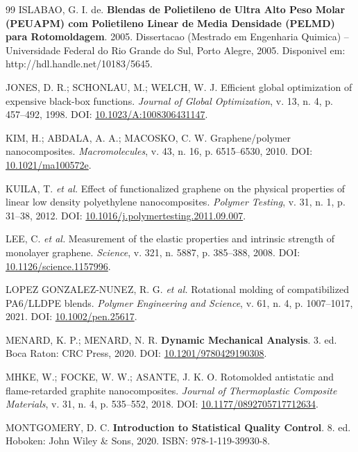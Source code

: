 \documentclass[11pt,a4paper,oneside]{article}
\begin{document}
\begin{thebibliography}{99}
 ISLABAO, G. I. de. \textbf{Blendas de Polietileno de Ultra Alto Peso Molar (PEUAPM) com Polietileno Linear de Media Densidade (PELMD) para Rotomoldagem}. 2005. Dissertacao (Mestrado em Engenharia Quimica) -- Universidade Federal do Rio Grande do Sul, Porto Alegre, 2005. Disponivel em: http://hdl.handle.net/10183/5645.

 JONES, D. R.; SCHONLAU, M.; WELCH, W. J. Efficient global optimization of expensive black-box functions. \textit{Journal of Global Optimization}, v. 13, n. 4, p. 457--492, 1998. DOI: \href{https://doi.org/10.1023/A:1008306431147}{10.1023/A:1008306431147}.

 KIM, H.; ABDALA, A. A.; MACOSKO, C. W. Graphene/polymer nanocomposites. \textit{Macromolecules}, v. 43, n. 16, p. 6515--6530, 2010. DOI: \href{https://doi.org/10.1021/ma100572e}{10.1021/ma100572e}.

 KUILA, T. \textit{et al.} Effect of functionalized graphene on the physical properties of linear low density polyethylene nanocomposites. \textit{Polymer Testing}, v. 31, n. 1, p. 31--38, 2012. DOI: \href{https://doi.org/10.1016/j.polymertesting.2011.09.007}{10.1016/j.polymertesting.2011.09.007}.

 LEE, C. \textit{et al.} Measurement of the elastic properties and intrinsic strength of monolayer graphene. \textit{Science}, v. 321, n. 5887, p. 385--388, 2008. DOI: \href{https://doi.org/10.1126/science.1157996}{10.1126/science.1157996}.

 LOPEZ GONZALEZ-NUNEZ, R. G. \textit{et al.} Rotational molding of compatibilized PA6/LLDPE blends. \textit{Polymer Engineering and Science}, v. 61, n. 4, p. 1007--1017, 2021. DOI: \href{https://doi.org/10.1002/pen.25617}{10.1002/pen.25617}.

 MENARD, K. P.; MENARD, N. R. \textbf{Dynamic Mechanical Analysis}. 3. ed. Boca Raton: CRC Press, 2020. DOI: \href{https://doi.org/10.1201/9780429190308}{10.1201/9780429190308}.

 MHKE, W.; FOCKE, W. W.; ASANTE, J. K. O. Rotomolded antistatic and flame-retarded graphite nanocomposites. \textit{Journal of Thermoplastic Composite Materials}, v. 31, n. 4, p. 535--552, 2018. DOI: \href{https://doi.org/10.1177/0892705717712634}{10.1177/0892705717712634}.

 MONTGOMERY, D. C. \textbf{Introduction to Statistical Quality Control}. 8. ed. Hoboken: John Wiley \& Sons, 2020. ISBN: 978-1-119-39930-8.


\end{thebibliography}
\end{document}
